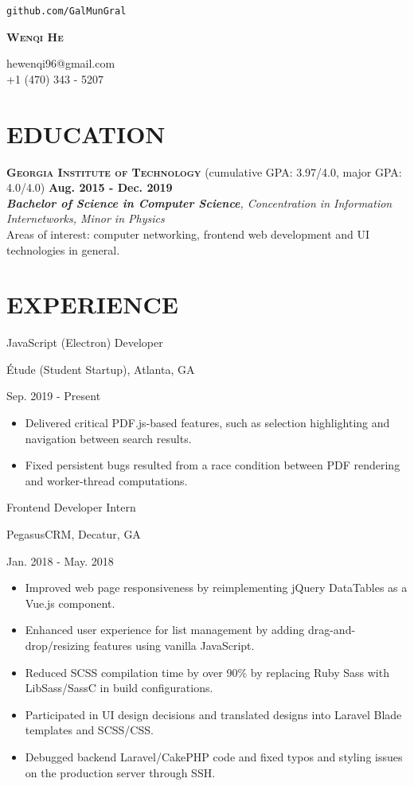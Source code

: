 \documentclass[11pt]{article}
\newcommand{\centertitle}[3]{
	{\noindent\bfseries
	\parbox[][0.5em][b]{0.35\textwidth}{#1\hfill}%
	\parbox[][0.5em][b]{0.3\textwidth}{\centerline{#2}}%
	\parbox[][0.5em][b]{0.35\textwidth}{\hfill#3}}
}
\begin{document}
\noindent
\parbox{0.25\textwidth}{\hfill\texttt{github.com/GalMunGral}}
\parbox{0.5\textwidth}{\centerline{\Huge\scshape\bfseries Wenqi He}}
\parbox{0.25\textwidth}{hewenqi96@gmail.com\\+1 (470) 343 - 5207}
%
\section*{EDUCATION}
{\large\scshape\bfseries Georgia Institute of Technology} \enspace (cumulative GPA: 3.97/4.0, major GPA: 4.0/4.0) \hfill {\bfseries Aug. 2015 - Dec. 2019}\\
{\itshape {\bfseries Bachelor of Science in Computer Science}, Concentration in Information Internetworks,  Minor in Physics}\\
\indent Areas of interest: {computer networking, frontend web development and UI technologies in general}.
\vspace{-0.5em}

\section*{EXPERIENCE}
\centertitle{JavaScript (Electron) Developer}{Étude (Student Startup), Atlanta, GA}{Sep. 2019 - Present}
\begin{itemize}[leftmargin=15pt, noitemsep, topsep=0pt]
\item Delivered critical PDF.js-based features, such as selection highlighting and navigation between search results.
\item Fixed persistent bugs resulted from a race condition between PDF rendering and worker-thread computations.
\end{itemize}
\vspace{1em}
\centertitle{Frontend Developer Intern}{PegasusCRM, Decatur, GA}{Jan. 2018 - May. 2018}
\begin{itemize}[leftmargin=15pt, noitemsep, topsep=0pt]
\item Improved web page responsiveness by reimplementing jQuery DataTables as a Vue.js component.
\item Enhanced user experience for list management by adding drag-and-drop/resizing features using vanilla JavaScript.
\item Reduced SCSS compilation time by over 90\% by replacing Ruby Sass with LibSass/SassC in build configurations.
\item Participated in UI design decisions and translated designs into Laravel Blade templates and SCSS/CSS.
\item Debugged backend Laravel/CakePHP code and fixed typos and styling issues on the production server through SSH.
\end{itemize}
\vspace{-0.5em}
\end{document}

